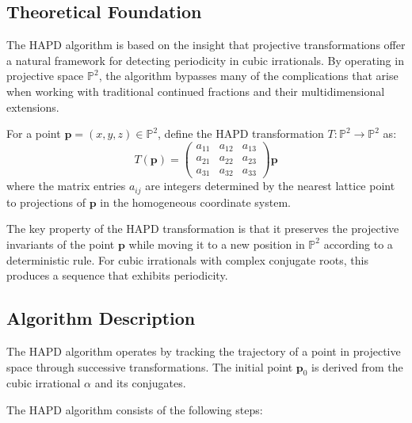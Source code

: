 \subsection{Theoretical Foundation}

The HAPD algorithm is based on the insight that projective transformations offer a natural framework for detecting periodicity in cubic irrationals. By operating in projective space $\mathbb{P}^2$, the algorithm bypasses many of the complications that arise when working with traditional continued fractions and their multidimensional extensions.

\begin{definition}
For a point $\mathbf{p} = (x, y, z) \in \mathbb{P}^2$, define the HAPD transformation $T: \mathbb{P}^2 \rightarrow \mathbb{P}^2$ as:
\begin{equation}
T(\mathbf{p}) = 
\begin{pmatrix}
a_{11} & a_{12} & a_{13} \\
a_{21} & a_{22} & a_{23} \\
a_{31} & a_{32} & a_{33}
\end{pmatrix}
\mathbf{p}
\end{equation}
where the matrix entries $a_{ij}$ are integers determined by the nearest lattice point to projections of $\mathbf{p}$ in the homogeneous coordinate system.
\end{definition}

The key property of the HAPD transformation is that it preserves the projective invariants of the point $\mathbf{p}$ while moving it to a new position in $\mathbb{P}^2$ according to a deterministic rule. For cubic irrationals with complex conjugate roots, this produces a sequence that exhibits periodicity.

\subsection{Algorithm Description}

The HAPD algorithm operates by tracking the trajectory of a point in projective space through successive transformations. The initial point $\mathbf{p}_0$ is derived from the cubic irrational $\alpha$ and its conjugates.

The HAPD algorithm consists of the following steps:

